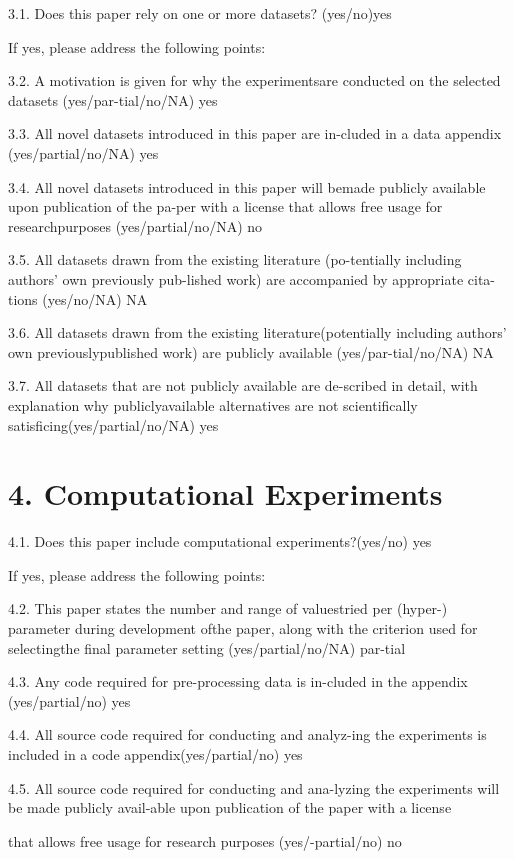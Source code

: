 \documentclass[
  10
]{article}
\begin{document}
3.1. Does this paper rely on one or more datasets? (yes/no)yes

If yes, please address the following points:

3.2. A motivation is given for why the experimentsare conducted on the
selected datasets (yes/par-tial/no/NA) yes

3.3. All novel datasets introduced in this paper are in-cluded in a data
appendix (yes/partial/no/NA) yes

3.4. All novel datasets introduced in this paper will bemade publicly
available upon publication of the pa-per with a license that allows free
usage for researchpurposes (yes/partial/no/NA) no

3.5. All datasets drawn from the existing literature (po-tentially
including authors' own previously pub-lished work) are accompanied by
appropriate cita-tions (yes/no/NA) NA

3.6. All datasets drawn from the existing literature(potentially
including authors' own previouslypublished work) are publicly available
(yes/par-tial/no/NA) NA

3.7. All datasets that are not publicly available are de-scribed in
detail, with explanation why publiclyavailable alternatives are not
scientifically satisficing(yes/partial/no/NA) yes

\section{4. Computational Experiments}\label{computational-experiments}

4.1. Does this paper include computational experiments?(yes/no) yes

If yes, please address the following points:

4.2. This paper states the number and range of valuestried per (hyper-)
parameter during development ofthe paper, along with the criterion used
for selectingthe final parameter setting (yes/partial/no/NA) par-tial

4.3. Any code required for pre-processing data is in-cluded in the
appendix (yes/partial/no) yes

4.4. All source code required for conducting and analyz-ing the
experiments is included in a code appendix(yes/partial/no) yes

4.5. All source code required for conducting and ana-lyzing the
experiments will be made publicly avail-able upon publication of the
paper with a license

that allows free usage for research purposes (yes/-partial/no) no
\end{document}
